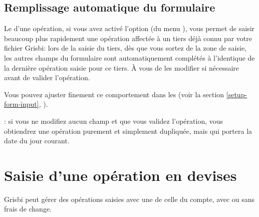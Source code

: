 \subsection{Remplissage automatique du formulaire\label{transactions-new-autofill}}%

Le  d'une opération, si vous avez activé l'option  (du menu ), vous permet de saisir beaucoup plus rapidement une opération affectée à un tiers déjà connu par votre fichier Grisbi: lors de la saisie du tiers, dès que vous sortez de la zone de saisie, les autres champs du formulaire sont automatiquement complétés à l'identique de la dernière opération saisie pour ce tiers. À vous de les modifier si nécessaire avant de valider l'opération.

Vous pouvez ajuster finement ce comportement dans les  (voir la section \vref{setup-form-input}, ).

\Note{}: si vous ne modifiez aucun champ et que vous validez l'opération, vous obtiendrez une opération purement et simplement dupliquée, mais qui portera la date du jour courant.


\section{Saisie d'une opération en devises\label{transactions-currencies}}

Grisbi peut gérer des opérations saisies avec une  de celle du compte, avec ou sans frais de change.

